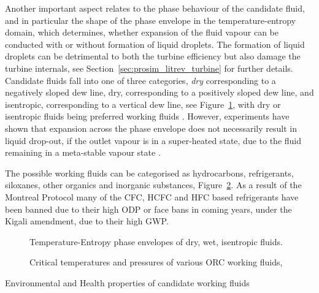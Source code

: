         Another important aspect relates to the phase behaviour of the candidate fluid, and in particular the shape of the phase envelope in the temperature-entropy domain, which determines, whether expansion of the fluid vapour can be conducted with or without formation of liquid droplets. The formation of liquid droplets can be detrimental to both the turbine efficiency but also damage the turbine internals, see Section~\ref{sec:prosim_litrev_turbine} for further details. Candidate fluids fall into one of three categories, \emph{dry} corresponding to a negatively sloped dew line, dry, corresponding to a positively sloped dew line, and isentropic, corresponding to a vertical dew line, see Figure~\ref{fig:litrev_ORC_working_fluid_types}, with dry or isentropic fluids being  preferred working fluids \cite{DiPippo2016}. However, experiments have shown that expansion across the phase envelope does not necessarily result in liquid drop-out, if the outlet vapour is in a super-heated state, due to the fluid remaining in a meta-stable vapour state \cite{Mines1997,Bliem1992}. 

        The possible working fluids can be categorised as hydrocarbons, refrigerants, siloxanes, other organics and inorganic substances, Figure~\ref{fig:litrev_ORC_working_fluids}. As a result of the Montreal Protocol \cite{Montreal2020} many of the \ac{CFC}, \ac{HCFC} and \ac{HFC} based refrigerants have been banned due to their high \ac{ODP} or face bans in coming years, under the Kigali amendment, due to their high \ac{GWP}.

         \begin{figure}[H]
            \centering
            
            \caption{Temperature-Entropy phase envelopes of dry, wet, isentropic fluids. \cite{Babatunde2018}}
            \label{fig:litrev_ORC_working_fluid_types}
        \end{figure}  

         \begin{figure}[H]
            \centering
            
            \caption{Critical temperatures and pressures of various \ac{ORC} working fluids, \cite{Astolfi2014A, Bell2014}}
            \label{fig:litrev_ORC_working_fluids}
        \end{figure}

        \begin{table}[H]
            \caption{Environmental and Health properties of candidate working fluids \cite{DiPippo2016}}
            \centering 
            \label{table:working_fluid_properties}
                    
            \\[10pt]
        \end{table}
        
